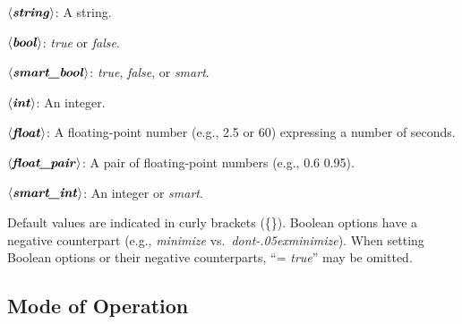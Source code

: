 \documentclass[a4paper,12pt]{article}
\def\qtybf#1{$\mathbf{\left<\textbf{\textit{#1\/}}\right>}$}
\renewcommand\_{\hbox{\textunderscore\kern-.05ex}}
\begin{document}
\begin{enum}
\item[\labelitemi] \qtybf{string}: A string.
\item[\labelitemi] \qtybf{bool\/}: \textit{true} or \textit{false}.
\item[\labelitemi] \qtybf{smart\_bool\/}: \textit{true}, \textit{false}, or
\textit{smart}.
\item[\labelitemi] \qtybf{int\/}: An integer.
\item[\labelitemi] \qtybf{float}: A floating-point number (e.g., 2.5 or 60)
expressing a number of seconds.
\item[\labelitemi] \qtybf{float\_pair\/}: A pair of floating-point numbers
(e.g., 0.6 0.95).
\item[\labelitemi] \qtybf{smart\_int\/}: An integer or \textit{smart}.
\end{enum}

Default values are indicated in curly brackets (\textrm{\{\}}). Boolean options
have a negative counterpart (e.g., \textit{minimize} vs.\
\textit{dont\_minimize}). When setting Boolean options or their negative
counterparts, ``= \textit{true\/}'' may be omitted.


\subsection{Mode of Operation}
\label{mode-of-operation}
\end{document}
